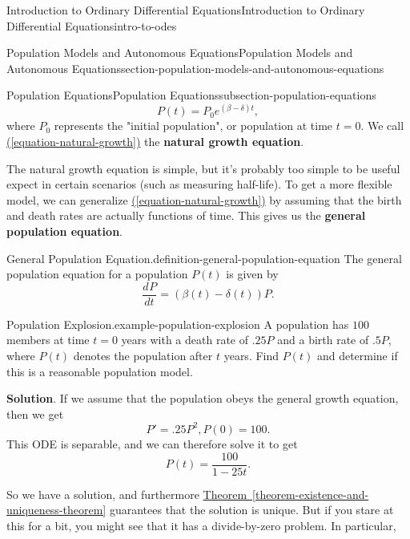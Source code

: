 \documentclass[oneside,10pt,]{book}
\newcommand{\terminology}[1]{\textbf{#1}}
\numberwithin{equation}{section}
\newcommand{\dv}[3][]{\dfrac{d^{#1} #2}{d #3^{#1}}}
\begin{document}
\begin{chapterptx}{Introduction to Ordinary Differential Equations}{}{Introduction to Ordinary Differential Equations}{}{}{intro-to-odes}
\begin{sectionptx}{Population Models and Autonomous Equations}{}{Population Models and Autonomous Equations}{}{}{section-population-models-and-autonomous-equations}
\begin{subsectionptx}{Population Equations}{}{Population Equations}{}{}{subsection-population-equations}
\begin{equation*}
P(t) = P_{0}e^{(\beta - \delta)t},
\end{equation*}
where \(P_{0}\) represents the "initial population", or population at time \(t = 0\). We call \hyperref[equation-natural-growth]{(\ref{equation-natural-growth})} the \terminology{natural growth equation}.%
\par
\hypertarget{p-106}{}%
The natural growth equation is simple, but it's probably too simple to be useful expect in certain scenarios (such as measuring half-life). To get a more flexible model, we can generalize \hyperref[equation-natural-growth]{(\ref{equation-natural-growth})} by assuming that the birth and death rates are actually functions of time. This gives us the \terminology{general population equation}.%
\begin{definition}{General Population Equation.}{definition-general-population-equation}%
\hypertarget{p-107}{}%
The general population equation for a population \(P(t)\) is given by%
\begin{equation*}
\dv{P}{t} = (\beta(t) - \delta(t))P.
\end{equation*}
%
\end{definition}
\begin{example}{Population Explosion.}{example-population-explosion}%
\hypertarget{p-108}{}%
A population has \(100\) members at time \(t = 0\) years with a death rate of \(.25P\) and a birth rate of \(.5P\), where \(P(t)\) denotes the population after \(t\) years. Find \(P(t)\) and determine if this is a reasonable population model.%
\par\smallskip%
\noindent\textbf{Solution}.\hypertarget{solution-17}{}\quad%
\hypertarget{p-109}{}%
If we assume that the population obeys the general growth equation, then we get%
\begin{equation*}
P' = .25P^{2}, P(0) = 100.
\end{equation*}
This ODE is separable, and we can therefore solve it to get%
\begin{equation*}
P(t) = \frac{100}{1 - 25t}.
\end{equation*}
%
\par
\hypertarget{p-110}{}%
So we have a solution, and furthermore \hyperref[theorem-existence-and-uniqueness-theorem]{Theorem~\ref{theorem-existence-and-uniqueness-theorem}} guarantees that the solution is unique. But if you stare at this for a bit, you might see that it has a divide-by-zero problem. In particular,%
\begin{equation*}

\end{equation*}
\end{example}
\end{subsectionptx}
\end{sectionptx}
\end{chapterptx}
\end{document}
